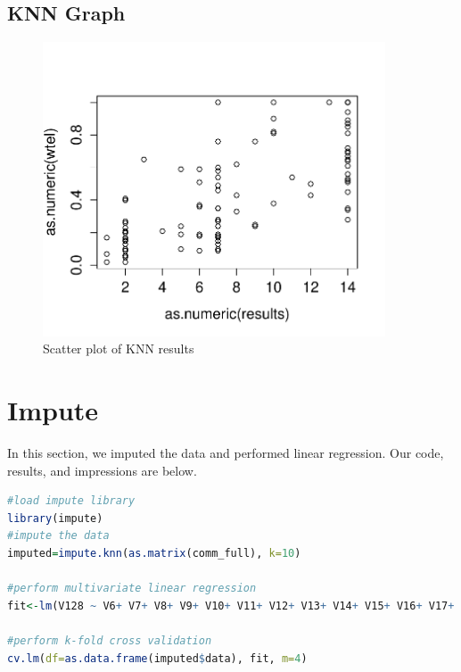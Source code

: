 \documentclass{article}
\begin{document}
\subsection{KNN Graph}
\begin{figure}[H]
\centering
\includegraphics[width=4in]{knn.pdf}
\caption{Scatter plot of KNN results}
\end{figure}

\section{Impute}
In this section, we imputed the data and performed linear regression. Our code,
results, and impressions are below. 

\begin{lstlisting}[language=r]
#load impute library
library(impute)
#impute the data
imputed=impute.knn(as.matrix(comm_full), k=10)

#perform multivariate linear regression
fit<-lm(V128 ~ V6+ V7+ V8+ V9+ V10+ V11+ V12+ V13+ V14+ V15+ V16+ V17+ V18+ V19+ V20+ V21+ V22+ V23+ V24+ V25+ V26+ V27+ V28+ V29+ V30+ V32+ V33+ V34+ V35+ V36+ V37+ V38+ V39+ V40+ V41+ V42+ V43+ V44+ V45+ V46+ V47+ V48+ V49+ V50+ V51+ V52+ V53+ V54+ V55+ V56+ V57+ V58+ V59+ V60+ V61+ V62+ V63+ V64+ V65+ V66+ V67+ V68+ V69+ V70+ V71+ V72+ V73+ V74+ V75+ V76+ V77+ V78+ V79+ V80+ V81+ V82+ V83+ V84+ V85+ V86+ V87+ V88+ V89+ V90+ V91+ V92+ V93+ V94+ V95+ V96+ V97+ V98+ V99+ V100+ V101+ V119+ V120+ V121+ V126, data=as.data.frame(imputed$data))

#perform k-fold cross validation
cv.lm(df=as.data.frame(imputed$data), fit, m=4)
\end{lstlisting}
\end{document}

